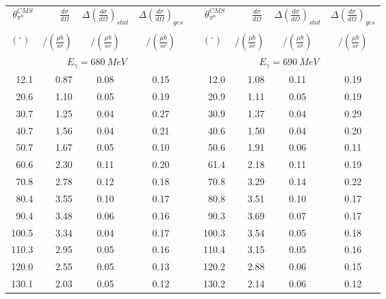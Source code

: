 \begin{table}[htbp] 
\begin{center} 
\begin{tabular}{|r|r|c|c|l|r|r|c|c|} 

\cline{1-4}
\cline{6-9} 
$\theta_{\pi^0}^{CMS}$ & 
$\displaystyle\frac{d\sigma}{d\Omega}\;$ & 
${\Delta}\left( \frac{d\sigma}{d\Omega}\right)_{stat}$ & 
${\Delta}\left( \frac{d\sigma}{d\Omega}\right)_{ges}$ & & 
$\theta_{\pi^0}^{CMS}$ & 
$\displaystyle\frac{d\sigma}{d\Omega}\;$ & 
${\Delta}\left( \frac{d\sigma}{d\Omega}\right)_{stat}$ & 
${\Delta}\left( \frac{d\sigma}{d\Omega}\right)_{ges}$ \\ 
& & & & & & & &\\ 
 $(^{\circ})\;$ & $/(\frac{{\mu}b}{sr})$ & $/(\frac{{\mu}b}{sr})$ & $/(\frac{{\mu}b}{sr})$ & & $(^{\circ})\;$ & $/(\frac{{\mu}b}{sr})$ & $/(\frac{{\mu}b}{sr})$ & $/(\frac{{\mu}b}{sr})$ \\ 
\cline{1-4} 
\cline{6-9} 
\multicolumn{4}{|c|}{ $E_{\gamma}=680~MeV$} & & 
\multicolumn{4}{c|}{ $E_{\gamma}=690~MeV$} \\ 
\cline{1-4} 
\cline{6-9} 
 12.1 &  0.87 &  0.08 &  0.15 & &  12.0 &  1.08 &  0.11 &  0.19 \\ 
 20.6 &  1.10 &  0.05 &  0.19 & &  20.9 &  1.11 &  0.05 &  0.19 \\ 
 30.7 &  1.25 &  0.04 &  0.27 & &  30.9 &  1.37 &  0.04 &  0.29 \\ 
 40.7 &  1.56 &  0.04 &  0.21 & &  40.6 &  1.50 &  0.04 &  0.20 \\ 
 50.7 &  1.67 &  0.05 &  0.10 & &  50.6 &  1.91 &  0.06 &  0.11 \\ 
 60.6 &  2.30 &  0.11 &  0.20 & &  61.4 &  2.18 &  0.11 &  0.19 \\ 
 70.8 &  2.78 &  0.12 &  0.18 & &  70.8 &  3.29 &  0.14 &  0.22 \\ 
 80.4 &  3.55 &  0.10 &  0.17 & &  80.8 &  3.51 &  0.10 &  0.17 \\ 
 90.4 &  3.48 &  0.06 &  0.16 & &  90.3 &  3.69 &  0.07 &  0.17 \\ 
100.5 &  3.34 &  0.04 &  0.17 & & 100.3 &  3.54 &  0.05 &  0.18 \\ 
110.3 &  2.95 &  0.05 &  0.16 & & 110.4 &  3.15 &  0.05 &  0.16 \\ 
120.0 &  2.55 &  0.05 &  0.13 & & 120.2 &  2.88 &  0.06 &  0.15 \\ 
130.1 &  2.03 &  0.05 &  0.12 & & 130.2 &  2.14 &  0.06 &  0.12 \\ 

\end{tabular}
\end{center}
\end{table}
